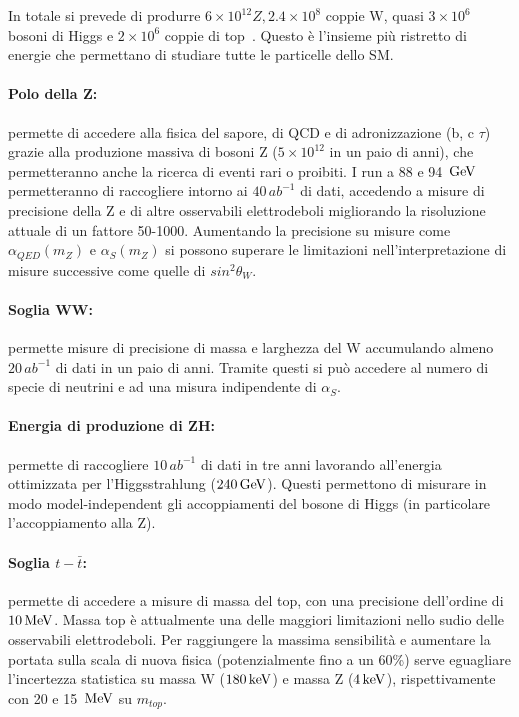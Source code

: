 In totale si prevede di produrre $6\times10^{12} Z, 2.4\times10^{8}$ coppie W, quasi $3\times10^{6}$ bosoni di Higgs e $2\times10^{6}$ coppie di top~\cite{FCC:FSR-v1}. Questo è l'insieme più ristretto di energie che permettano di studiare tutte le particelle dello SM.

\paragraph{Polo della Z:} permette di accedere alla fisica del sapore, di QCD e di adronizzazione (b, c $\tau$) grazie alla produzione massiva di bosoni Z ($5\times10^{12}$ in un paio di anni), che permetteranno anche la ricerca di eventi rari o proibiti. I run a 88 e 94~$\mathrm{GeV}$ permetteranno di raccogliere intorno ai $40\,ab^{-1}$ di dati, accedendo a misure di precisione della Z e di altre osservabili elettrodeboli migliorando la risoluzione attuale di un fattore 50-1000. Aumentando la precisione su misure come $\alpha_{QED}(m_Z)$ e $\alpha_S(m_Z)$ si possono superare le limitazioni nell'interpretazione di misure successive come quelle di $sin^2\theta_W$.
\paragraph{Soglia WW:} permette misure di precisione di massa e larghezza del W accumulando almeno $20\,ab^{-1}$ di dati in un paio di anni. Tramite questi si può accedere al numero di specie di neutrini e ad una misura indipendente di $\alpha_S$.
\paragraph{Energia di produzione di ZH:} permette di raccogliere $10\,ab^{-1}$ di dati in tre anni lavorando all'energia ottimizzata per l'Higgsstrahlung ($240\,\mathrm{GeV}$). Questi permettono di misurare in modo model-independent gli accoppiamenti del bosone di Higgs (in particolare l'accoppiamento alla Z).
\paragraph{Soglia $t-\bar t$:} permette di accedere a misure di massa del top, con una precisione dell'ordine di $10\,\mathrm{MeV}$. Massa top è attualmente una delle maggiori limitazioni nello sudio delle osservabili elettrodeboli. Per raggiungere la massima sensibilità e aumentare la portata sulla scala di nuova fisica (potenzialmente fino a un 60\%) serve eguagliare l'incertezza statistica su massa W ($180\,\mathrm{keV}$) e massa Z ($4\,\mathrm{keV}$), rispettivamente con 20 e 15~$\mathrm{MeV}$ su $m_{top}$.
